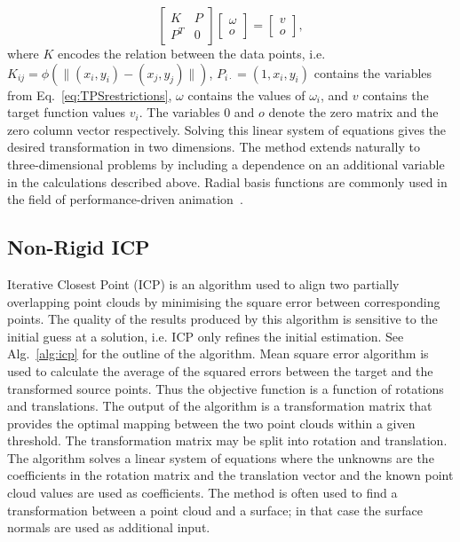 \documentclass[11pt]{report}
\begin{document}
\begin{equation}
\begin{bmatrix}
	K & P \\
	P^T & 0 
\end{bmatrix} 
\begin{bmatrix}
	\omega \\
	o
\end{bmatrix} = 
\begin{bmatrix}
	v \\
	o
\end{bmatrix}, 
\end{equation} where $K$ encodes the relation between the data points, i.e. $K_{ij} = \phi(\|(x_i,y_i) - (x_j,y_j)\|)$, $P_{i\cdot} = (1, x_i, y_i)$ contains the variables from Eq.~\ref{eq:TPSrestrictions}, $\omega$ contains the values of $\omega_i$, and $v$ contains the target function values $v_i$. The variables $0$ and $o$ denote the zero matrix and the zero column vector respectively. Solving this linear system of equations gives the desired transformation in two dimensions. The method extends naturally to three-dimensional problems by including a dependence on an additional variable in the calculations described above. Radial basis functions are commonly used in the field of performance-driven animation~\cite{Joshi:2003}.

\subsection{Non-Rigid ICP}
Iterative Closest Point (ICP) is an algorithm used to align two partially overlapping point clouds by minimising the square error between corresponding points. The quality of the results produced by this algorithm is sensitive to the initial guess at a solution, i.e. ICP only refines the initial estimation. See Alg.~\ref{alg:icp} for the outline of the algorithm. Mean square error algorithm is used to calculate the average of the squared errors between the target and the transformed source points. Thus the objective function is a function of rotations and translations. The output of the algorithm is a transformation matrix that provides the optimal mapping between the two point clouds within a given threshold. The transformation matrix may be split into rotation and translation. The algorithm solves a linear system of equations where the unknowns are the coefficients in the rotation matrix and the translation vector and the known point cloud values are used as coefficients. The method is often used to find a transformation between a point cloud and a surface; in that case the surface normals are used as additional input.
\end{document}
